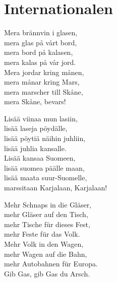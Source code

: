 \section{Internationalen}

Mera brännvin i glasen,\\
mera glas på vårt bord,\\
mera bord på kalasen,\\
mera kalas på vår jord.\\
Mera jordar kring månen,\\
mera månar kring Mars,\\
mera marscher till Skåne,\\
mera Skåne, bevars!

Lisää viinaa mun lasiin,\\
lisää laseja pöydälle,\\
lisää pöytiä näihin juhliin,\\
lisää juhlia kansalle.\\
Lisää kansaa Suomeen,\\
lisää suomea päälle maan,\\
lisää maata suur-Suomelle,\\
marssitaan Karjalaan, Karjalaan!

Mehr Schnaps in die Gläser,\\
mehr Gläser auf den Tisch,\\
mehr Tische für dieses Fest,\\
mehr Feste für das Volk.\\
Mehr Volk in den Wagen,\\
mehr Wagen auf die Bahn,\\
mehr Autobahnen für Europa.\\
Gib Gas, gib Gas du Arsch.